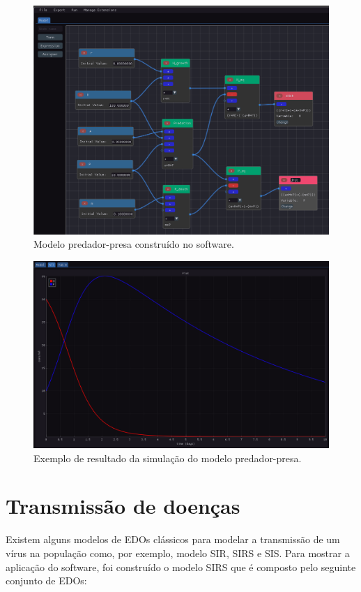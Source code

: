 \documentclass[
	12pt,				%
	openright,			%
	oneside,			%
	a4paper,			%
	main=brazil,
	english,			%
	]{ufsj-abntex2}
\begin{document}
\begin{figure}[h]
    \centering
    \includegraphics[width=\textwidth]{imgs/modelos/predador-presa.png} 
    \caption{Modelo predador-presa construído no software.}
    \label{fig:predador-presa}
\end{figure}

\begin{figure}[h]
    \centering
    \includegraphics[width=\textwidth]{imgs/modelos/resultado-predador-presa.png} 
    \caption{Exemplo de resultado da simulação do modelo predador-presa.}
    \label{fig:resultado-predador-presa}
\end{figure}


\section{Transmissão de doenças}
Existem alguns modelos de EDOs clássicos para modelar a transmissão de um vírus na população como, por exemplo, modelo SIR, SIRS e SIS. Para mostrar a aplicação do software, foi construído o modelo SIRS que é composto pelo seguinte conjunto de EDOs: 
\end{document}
